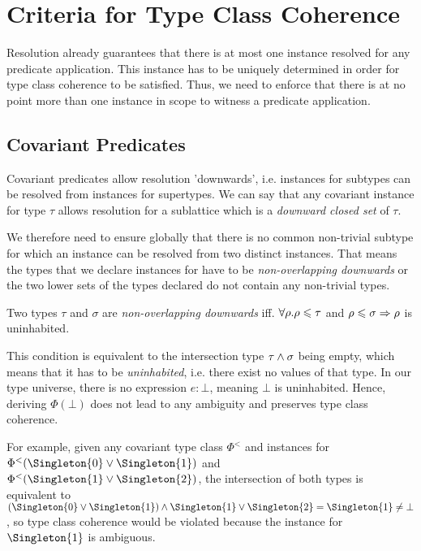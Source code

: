 
\section{Criteria for Type Class Coherence}

Resolution already guarantees that there is at most one instance resolved for any predicate application.
This instance has to be uniquely determined in order for type class coherence to be satisfied.
Thus, we need to enforce that there is at no point more than one instance in scope to witness a predicate application.

\subsection{Covariant Predicates}

Covariant predicates allow resolution 'downwards', i.e. instances for subtypes can be resolved from instances for supertypes.
We can say that any covariant instance for type $\tau$ allows resolution for a sublattice which is a \emph{downward closed set} of $\tau$.

We therefore need to ensure globally that there is no common non-trivial subtype for which an instance can be resolved from two distinct instances.
That means the types that we declare instances for have to be \emph{non-overlapping downwards} or the two lower sets of the types declared do not contain any non-trivial types. 

\begin{definition}
  Two types $\tau$ and $\sigma$ are \emph{non-overlapping downwards} iff. $\forall\rho. \rho \leqslant \tau$ and $\rho \leqslant \sigma \Rightarrow \rho$ is uninhabited.
\end{definition}

This condition is equivalent to the intersection type $\tau \wedge \sigma$ being empty, which means that it has to be \emph{uninhabited}, i.e. there exist no values of that type.
In our type universe, there is no expression $e : \bot$, meaning $\bot$ is uninhabited.
Hence, deriving $\Phi(\bot)$ does not lead to any ambiguity and preserves type class coherence.

For example, given any covariant type class $\Phi^<$ and instances for $\Phi^<(\Singleton{0} \join \Singleton{1})$ and $\Phi^<(\Singleton{1} \join \Singleton{2})$,
the intersection of both types is equivalent to $(\Singleton{0} \join \Singleton{1}) \meet \Singleton{1} \join \Singleton{2} = \Singleton{1} \neq \bot$, so type class coherence would be violated because the instance for $\Singleton{1}$ is ambiguous.

